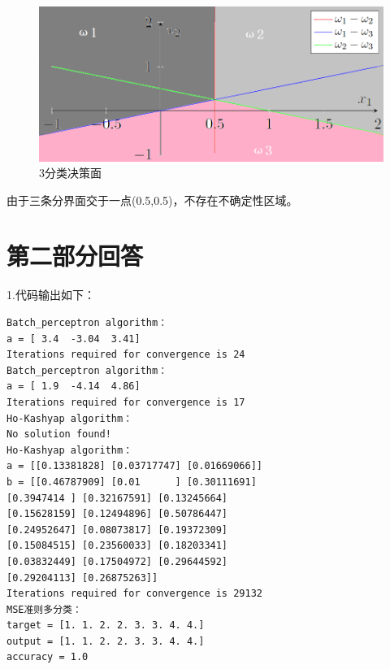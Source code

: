 \documentclass[a4paper,11pt,onecolumn,oneside,UTF8]{article}
\begin{document}
\begin{enumerate}
          \begin{figure}[H]
              \centering
              \includegraphics[width=.8\textwidth]{hw3_2.png}
              \caption{ 3分类决策面 }
              \label{img1}
          \end{figure}
          由于三条分界面交于一点(0.5,0.5)，不存在不确定性区域。
\end{enumerate}

\section*{第二部分回答}

1.代码输出如下：\\
\begin{lstlisting}
Batch_perceptron algorithm：
a = [ 3.4  -3.04  3.41]
Iterations required for convergence is 24
Batch_perceptron algorithm：
a = [ 1.9  -4.14  4.86]
Iterations required for convergence is 17
Ho-Kashyap algorithm：
No solution found!
Ho-Kashyap algorithm：
a = [[0.13381828] [0.03717747] [0.01669066]]
b = [[0.46787909] [0.01      ] [0.30111691]
[0.3947414 ] [0.32167591] [0.13245664]
[0.15628159] [0.12494896] [0.50786447]
[0.24952647] [0.08073817] [0.19372309]
[0.15084515] [0.23560033] [0.18203341]
[0.03832449] [0.17504972] [0.29644592]
[0.29204113] [0.26875263]]
Iterations required for convergence is 29132
MSE准则多分类：
target = [1. 1. 2. 2. 3. 3. 4. 4.]
output = [1. 1. 2. 2. 3. 3. 4. 4.]
accuracy = 1.0
\end{lstlisting}
\end{document}
